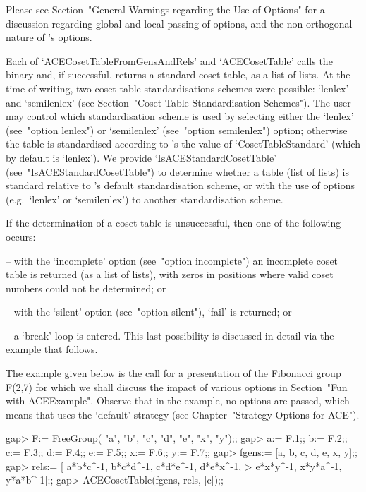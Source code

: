 Please see Section~"General Warnings regarding the Use of Options" for
a discussion regarding global and local passing of  options,  and  the
non-orthogonal nature of {\ACE}'s options.

Each of `ACECosetTableFromGensAndRels' and `ACECosetTable'  calls  the
{\ACE} binary and, if successful, returns a standard coset table, as a
{\GAP} list of  lists.  At  the  time  of  writing,  two  coset  table
standardisations schemes were possible: `lenlex' and `semilenlex' (see
Section~"Coset Table Standardisation Schemes"). The user  may  control
which standardisation scheme is used by selecting either the  `lenlex'
(see~"option  lenlex")  or  `semilenlex'   (see~"option   semilenlex")
option;  otherwise  the  table  is  standardised according to {\GAP}'s
the  value  of  `CosetTableStandard'  (which  by default is `lenlex').
We provide  `IsACEStandardCosetTable'  (see~"IsACEStandardCosetTable")
to determine whether a table (list of lists) is standard  relative  to
{\GAP}'s default standardisation scheme, or with the  use  of  options
(e.g.~`lenlex' or `semilenlex') to another standardisation scheme.

If the determination of a coset table is unsuccessful, then one of the
following occurs:

\beginlist%

\item{--} with the `incomplete' option  (see~"option  incomplete")  an
incomplete coset table is returned (as a list of lists), with zeros in
positions where valid coset numbers could not be determined; or

\item{--} with the `silent' option (see~"option  silent"),  `fail'  is
returned; or

\item{--} a  `break'-loop  is  entered.  This  last   possibility   is
discussed in detail via the example that follows.

\endlist

The example given  below  is  the  call  for  a  presentation  of  the
Fibonacci group F(2,7) for  which  we  shall  discuss  the  impact  of
various options in Section~"Fun with ACEExample". Observe that in  the
example, no options are passed,  which  means  that  {\ACE}  uses  the
`default' strategy (see Chapter~"Strategy Options for ACE").

\beginexample
gap> F:= FreeGroup( "a", "b", "c", "d", "e", "x", "y");;
gap> a:= F.1;; b:= F.2;; c:= F.3;; d:= F.4;; e:= F.5;; x:= F.6;; y:= F.7;;
gap> fgens:= [a, b, c, d, e, x, y];;
gap> rels:= [ a*b*c^-1, b*c*d^-1, c*d*e^-1, d*e*x^-1,
>             e*x*y^-1, x*y*a^-1, y*a*b^-1];;
gap> ACECosetTable(fgens, rels, [c]);;

